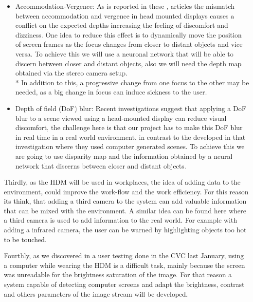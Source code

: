 \documentclass[10pt,a4paper,twocolumn,twoside]{article}
\begin{document}
	\begin{itemize}
		\item Accommodation-Vergence: As is reported in these \cite{disconfortReview}, \cite{vergenceDisconfort} articles the mismatch between accommodation and vergence in head mounted displays causes a conflict on the expected depths increasing the feeling of discomfort and dizziness.  One idea to reduce this effect is to dynamically move the position of screen frames as the focus changes from closer to distant objects and vice versa. To achieve this we will use a neuronal network that will be able to discern between closer and distant objects, also we will need the depth map obtained via the stereo camera setup. \\*
		In addition to this, a progressive change from one focus to the other may be needed, as a big change in focus can induce sickness to the user.
		
		\item Depth of field (DoF) blur: Recent investigations \cite{ifftConfortDoF} suggest that applying a DoF blur to a scene viewed using a head-mounted display can reduce visual discomfort, the challenge here is that our project has to make this DoF blur in real time in a real world environment, in contrast to the developed in that investigation where they used computer generated scenes. To achieve this we are going to use disparity map and the information obtained by a neural network that discerns between closer and distant objects.
	\end{itemize} 
	
	Thirdly, as the HDM will be used in workplaces, the idea of adding data to the environment, could improve the work-flow and the work efficiency. For this reason its think, that adding a third camera to the system can add valuable information that can be mixed with the environment. A similar idea can be found here \cite{vismerge} where a third camera is used to add information to the real world. For example with adding a infrared camera, the user can be warned by highlighting objects too hot to be touched.
	
	Fourthly, as we discovered in a user testing done in the CVC \cite{unpublishCVC} last January, using a computer while wearing the HDM is a difficult task, mainly because the screen was unreadable for the brightness saturation of the image. For that reason a system capable of detecting computer screens and adapt the brightness, contrast and others parameters of the image stream will be developed.
	
\end{document}
